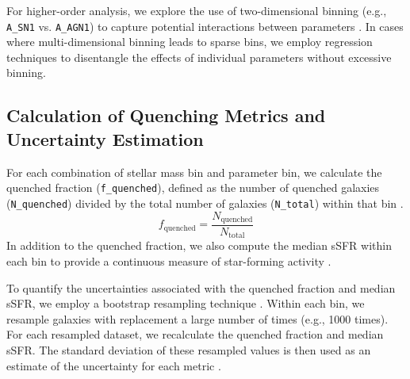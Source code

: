\documentclass[twocolumn]{aastex631}
\begin{document}
For higher-order analysis, we explore the use of two-dimensional binning (e.g., \texttt{A\_SN1} vs. \texttt{A\_AGN1}) to capture potential interactions between parameters \citep{cappellari2002adaptivespatialbinning2d,cappellari2003adaptivespatialbinningintegralfield,cappellari2009voronoibinningoptimaladaptive}. In cases where multi-dimensional binning leads to sparse bins, we employ regression techniques to disentangle the effects of individual parameters without excessive binning.

\subsection{Calculation of Quenching Metrics and Uncertainty Estimation}
For each combination of stellar mass bin and parameter bin, we calculate the quenched fraction (\texttt{f\_quenched}), defined as the number of quenched galaxies (\texttt{N\_quenched}) divided by the total number of galaxies (\texttt{N\_total}) within that bin \citep{xie2024quenchedgalaxieshow}.
\begin{equation}
f_{\text{quenched}} = \frac{N_{\text{quenched}}}{N_{\text{total}}}
\end{equation}
In addition to the quenched fraction, we also compute the median sSFR within each bin to provide a continuous measure of star-forming activity \citep{banerjee2023clusteringphysicalpropertiesstarforming,shi2023naturevsnurturerevisiting}.

To quantify the uncertainties associated with the quenched fraction and median sSFR, we employ a bootstrap resampling technique \citep{sanderson2009xraymodellinggalaxycluster,mohammad2022creatingjackknifebootstrapestimates}. Within each bin, we resample galaxies with replacement a large number of times (e.g., 1000 times). For each resampled dataset, we recalculate the quenched fraction and median sSFR. The standard deviation of these resampled values is then used as an estimate of the uncertainty for each metric \citep{sanderson2009xraymodellinggalaxycluster,mohammad2022creatingjackknifebootstrapestimates}.
\end{document}
